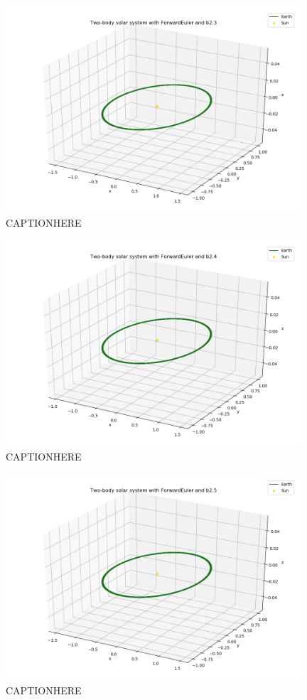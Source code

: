 \documentclass{article}
\begin{document}
    \begin{figure}[H]
        \centering
        \includegraphics[width = 11cm]{img/plot3D_S_E_F_b23.png}
        \caption{CAPTIONHERE}
        \label{fig:plot3D_S_E_F_b23}
    \end{figure}

    \begin{figure}[H]
        \centering
        \includegraphics[width = 11cm]{img/plot3D_S_E_F_b24.png}
        \caption{CAPTIONHERE}
        \label{fig:plot3D_S_E_F_b24}
    \end{figure}

    \begin{figure}[H]
        \centering
        \includegraphics[width = 11cm]{img/plot3D_S_E_F_b25.png}
        \caption{CAPTIONHERE}
        \label{fig:plot3D_S_E_F_b25}
    \end{figure}
\end{document}
